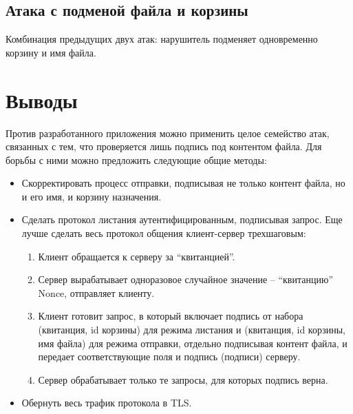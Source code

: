 \documentclass[a4paper,12pt]{article}
\begin{document}
\subsection{Атака с подменой файла и корзины}

Комбинация предыдущих двух атак: нарушитель подменяет одновременно корзину и имя файла.

\section*{Выводы}

Против разработанного приложения можно применить целое семейство атак, связанных с тем, что проверяется лишь подпись под контентом файла.
Для борьбы с ними можно предложить следующие общие методы:
\begin{itemize}
\item Скорректировать процесс отправки, подписывая не только контент файла, но и его имя, и корзину назначения.
 \item Сделать протокол листания аутентифицированным, подписывая запрос. Еще лучше сделать весь протокол общения клиент-сервер трехшаговым:
 \begin{enumerate}
 \item Клиент обращается к серверу за ``квитанцией''.
  \item Сервер вырабатывает одноразовое случайное значение -- ``квитанцию'' Nonce, отправляет клиенту.
  \item Клиент готовит запрос, в который включает подпись от набора (квитанция, id корзины) для режима листания и
  (квитанция, id корзины, имя файла) для режима отправки, отдельно подписывая контент файла, и передает соответствующие поля и подпись (подписи) серверу. 
  \item Сервер обрабатывает только те запросы, для которых подпись верна.
 \end{enumerate}
\item Обернуть весь трафик протокола в TLS.
 \end{itemize}
\end{document}
